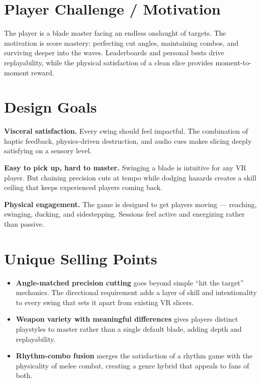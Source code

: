 \documentclass[12pt]{article}
\begin{document}
\section{Player Challenge / Motivation}

The player is a blade master facing an endless onslaught of targets. The motivation is score mastery: perfecting cut angles, maintaining combos, and surviving deeper into the waves. Leaderboards and personal bests drive replayability, while the physical satisfaction of a clean slice provides moment-to-moment reward.

\section{Design Goals}

\textbf{Visceral satisfaction.} Every swing should feel impactful. The combination of haptic feedback, physics-driven destruction, and audio cues makes slicing deeply satisfying on a sensory level.

\textbf{Easy to pick up, hard to master.} Swinging a blade is intuitive for any VR player. But chaining precision cuts at tempo while dodging hazards creates a skill ceiling that keeps experienced players coming back.

\textbf{Physical engagement.} The game is designed to get players moving --- reaching, swinging, ducking, and sidestepping. Sessions feel active and energizing rather than passive.

\section{Unique Selling Points}

\begin{itemize}[leftmargin=2em]
    \item \textbf{Angle-matched precision cutting} goes beyond simple ``hit the target'' mechanics. The directional requirement adds a layer of skill and intentionality to every swing that sets it apart from existing VR slicers.
    \item \textbf{Weapon variety with meaningful differences} gives players distinct playstyles to master rather than a single default blade, adding depth and replayability.
    \item \textbf{Rhythm-combo fusion} merges the satisfaction of a rhythm game with the physicality of melee combat, creating a genre hybrid that appeals to fans of both.
\end{itemize}
\end{document}

